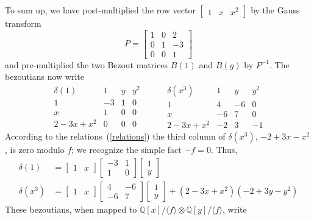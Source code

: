 \documentclass{standalone}
\begin{document}
\begin{rem}
To sum up, we have post-multiplied the row vector
$\begin{bmatrix}
	1 & x & x^2
\end{bmatrix}$ by the Gauss transform
$$P =
\begin{bmatrix}
	1 & 0 & 2 \\
	0 & 1 & -3 \\
	0 & 0 & 1
\end{bmatrix}$$
and pre-multiplied the two Bezout matrices $B(1)$ and $B(g)$ by $P^{-1}$. The bezoutians now write
$$
\begin{array}{c|ccc}
	\delta(1) & 1 & y & y^2\\
	\hline
	1 & -3 & 1 & 0\\
	x & 1 & 0 & 0\\
	2 - 3x + x^2 & 0 & 0 & 0
\end{array}
\hspace{1cm}
\begin{array}{c|ccc}
	\delta(x^3) & 1 & y & y^2\\
	\hline
	1 & 4 & -6 & 0 \\
	x & -6 & 7 & 0 \\
	2 - 3x + x^2 & -2 & 3 & -1
\end{array}
$$
According to the relations~(\ref{relations}) the third column of $\delta(x^3)$,  $-2 + 3x - x^2$, is zero modulo $f$; we recognize the simple fact $-f = 0$. Thus,
\begin{align} \nonumber %
\delta(1) &= \begin{bmatrix}
	1 & x
\end{bmatrix}
\begin{bmatrix}
	-3 & 1 \\
	1 & 0
\end{bmatrix} \nonumber %
\begin{bmatrix}
	1 \\
	y
\end{bmatrix}\\
\delta(x^3) &= \begin{bmatrix}
	1 & x
\end{bmatrix}
\begin{bmatrix}
	4 & -6 \\
	-6 & 7
\end{bmatrix} \nonumber %
\begin{bmatrix}
	1 \\
	y
\end{bmatrix} + (2 - 3x + x^2)(-2 + 3y - y^2)
\end{align}
These bezoutians, when mapped to $\mathbb{Q}[x]/\langle f \rangle \otimes \mathbb{Q}[y]/\langle f \rangle$, write

\end{rem}
\end{document}
